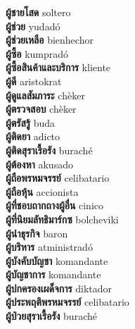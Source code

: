 \textbf{ ผู้ชายโสด  } soltero \\
\textbf{ ผู้ช่วย  } yudadó \\
\textbf{ ผู้ช่วยเหลือ  } bienhechor \\
\textbf{ ผู้ซื้อ  } kumpradó \\
\textbf{ ผู้ซื้อสินค้าและบริการ  } kliente \\
\textbf{ ผู้ดี  } aristokrat \\
\textbf{ ผู้ดูแลสัมภาระ  } chèker \\
\textbf{ ผู้ตรวจสอบ  } chèker \\
\textbf{ ผู้ตรัสรู้  } buda \\
\textbf{ ผู้ติดยา  } adicto \\
\textbf{ ผู้ติดสุราเรื้อรัง  } buraché \\
\textbf{ ผู้ต้องหา  } akusado \\
\textbf{ ผู้ถือพรหมจรรย์  } celibatario \\
\textbf{ ผู้ถือหุ้น  } accionista \\
\textbf{ ผู้ที่ชอบถากถางผู้อื่น  } cinico \\
\textbf{ ผู้ที่นิยมลัทธิมาร์กซ  } bolcheviki \\
\textbf{ ผู้นำธุรกิจ  } baron \\
\textbf{ ผู้บริหาร  } atministradó \\
\textbf{ ผู้บังคับบัญชา  } komandante \\
\textbf{ ผู้บัญชาการ  } komandante \\
\textbf{ ผู้ปกครองเผด็จการ  } diktador \\
\textbf{ ผู้ประพฤติพรหมจรรย์  } celibatario \\
\textbf{ ผู้ป่วยสุราเรื้อรัง  } buraché \\
